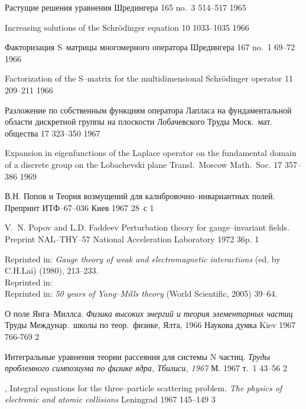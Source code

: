 {\LD}
{Растущие решения уравнения Шредингера}
{\DAN} {165} {no.~3} {514--517} {1965}

{\LF}
{Increasing solutions of the Schr\"odinger equation}
{\SPD} {10} {1033--1035} {1966}

{\LD}
{Факторизация S--матрицы многомерного оператора Шредингера}
{\DAN} {167} {no.~1} {69--72} {1966}

{\LF}
{Factorization of the S--matrix for the multidimensional
  {S}chr\"odinger operator}
{\SPD} {11} {209--211} {1966}

{\LD}
{Разложение по собственным функциям оператора Лапласа на
фундаментальной области дискретной группы на плоскости Лобачевского}
{Труды Моск.\ мат. общества} {17} {} {323--350} {1967}

{\LF}
{Expansion in eigenfunctions of the Laplace operator on the
fundamental domain of a discrete group on the Lobachevski plane}
{Transl.\ Moscow Math.\ Soc.} {17} {357--386} {1969}

{В.Н. Попов и \LD} 
{Теория возмущений для калибровочно--инвариантных  полей.}
{Препринт ИТФ--67--036} {} {Киев} {1967} {} {28~с} {1}

{V.~N. Popov and L.D. Faddeev} 
{Perturbation theory for gauge--invariant fields.} 
{Preprint NAL--THY--57} {National Acceleration Laboratory} {} {1972} {} {36p.} {1}

Reprinted in: {\em Gauge theory of weak and electromagnetic
interactions} (ed. by C.H.Lai) (1980), 213--233. \\
Reprinted in:  \\
Reprinted in: {\em 50 years of Yang--Mills theory}
(World Scientific, 2005) 39--64.

{\LD}
{О поле Янга--Миллса.} 
{\em Физика высоких энергий и теория элементарных частиц}
{Труды Междунар.\ школы по теор.\ физике, Ялта, 1966}
{Наукова думка} {Kiev} {1967} {} {766-769} {2}

{\LD} 
{Интегральные уравнения теории рассеяния для системы N частиц.} 
{\em Труды проблемного симпозиума по физике ядра, Тбилиси, 1967}
{} {М.} {1967} {т.~1} {43--56} {2}

{\LF,} 
{Integral equations for the three--particle scattering problem.}
{\em The physics of electronic and atomic collisions}
{} {Leningrad} {1967} {} {145--149} {3}

